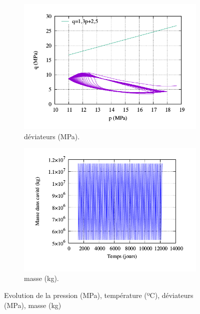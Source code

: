 \documentclass[11pt,french,a4paper]{article}
\begin{document}
\begin{figure}[h!]
\begin{subfigure}[b]{0.42\linewidth}
    \includegraphics[width=\linewidth]{image/chap2/q(t)1.png}
    \caption{déviateurs (MPa).}
\end{subfigure}
\begin{subfigure}[b]{0.42\linewidth}
    \includegraphics[width=\linewidth]{image/chap2/M1.png}
    \caption{masse (kg).}
\end{subfigure}

\caption{Evolution de la pression (MPa), température (ºC), déviateurs (MPa), masse (kg)}

\end{figure}
\end{document}
